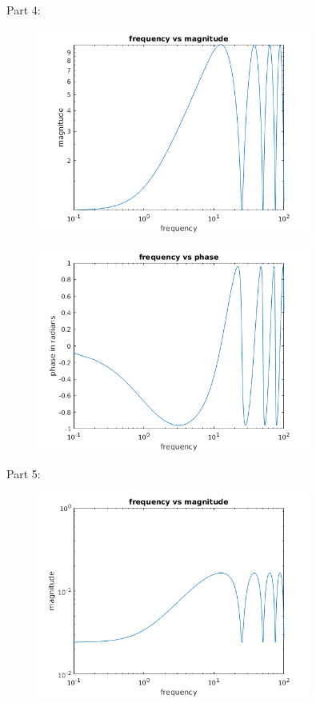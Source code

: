 \documentclass{article}
\begin{document}
Part 4:
\begin{figure}[H]
    \centering
    \includegraphics[width=0.8\textwidth]{PR3_4amp.png}
\end{figure}
\begin{figure}[H]
    \centering
    \includegraphics[width=0.8\textwidth]{PR3_4phase.png}
\end{figure}
Part 5:
\begin{figure}[H]
    \centering
    \includegraphics[width=0.8\textwidth]{PR3_5amp.png}
\end{figure}
\end{document}
